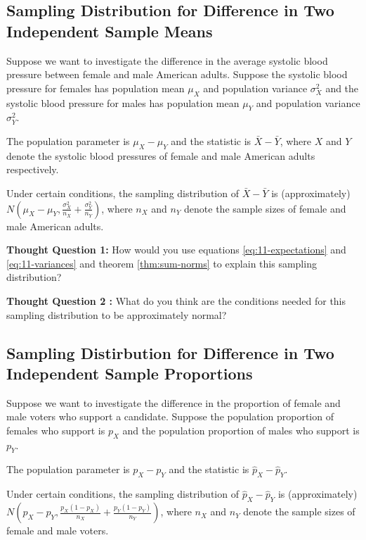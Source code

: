 \documentclass[
]{book}
\theoremstyle{definition}
\theoremstyle{definition}
\theoremstyle{definition}
\theoremstyle{definition}
\theoremstyle{remark}
\begin{document}
\hypertarget{two-means}{%
\subsection{Sampling Distribution for Difference in Two Independent Sample Means}\label{two-means}}

Suppose we want to investigate the difference in the average systolic blood pressure between female and male American adults. Suppose the systolic blood pressure for females has population mean \(\mu_X\) and population variance \(\sigma^2_X\) and the systolic blood pressure for males has population mean \(\mu_Y\) and population variance \(\sigma^2_Y\).

The population parameter is \(\mu_X - \mu_Y\) and the statistic is \(\bar{X} - \bar{Y}\), where \(X\) and \(Y\) denote the systolic blood pressures of female and male American adults respectively.

Under certain conditions, the sampling distribution of \(\bar{X} - \bar{Y}\) is (approximately) \(N(\mu_X - \mu_Y, \frac{\sigma^2_X}{n_X} + \frac{\sigma^2_Y}{n_Y})\), where \(n_X\) and \(n_Y\) denote the sample sizes of female and male American adults.

\textbf{Thought Question 1:} How would you use equations \eqref{eq:11-expectations} and \eqref{eq:11-variances} and theorem \ref{thm:sum-norms} to explain this sampling distribution?

\textbf{Thought Question 2 :} What do you think are the conditions needed for this sampling distribution to be approximately normal?

\hypertarget{two-props}{%
\subsection{Sampling Distirbution for Difference in Two Independent Sample Proportions}\label{two-props}}

Suppose we want to investigate the difference in the proportion of female and male voters who support a candidate. Suppose the population proportion of females who support is \(p_X\) and the population proportion of males who support is \(p_Y\).

The population parameter is \(p_X - p_Y\) and the statistic is \(\hat{p}_X - \hat{p}_Y\).

Under certain conditions, the sampling distribution of \(\hat{p}_X - \hat{p}_Y\) is (approximately) \(N(p_X - p_Y, \frac{p_X(1-p_X)}{n_X} + \frac{p_Y(1-p_Y)}{n_Y})\), where \(n_X\) and \(n_Y\) denote the sample sizes of female and male voters.
\end{document}
